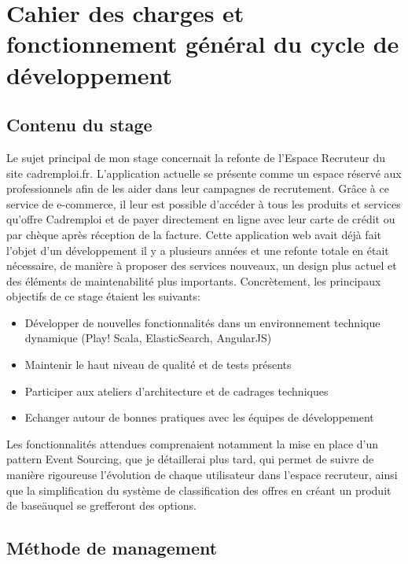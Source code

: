 \section{Cahier des charges et fonctionnement général du cycle de développement}
\subsection{Contenu du stage}
\label{sub:Contenu du stage}
Le sujet principal de mon stage concernait la refonte de l'Espace Recruteur du site cadremploi.fr.
L'application actuelle se présente comme un espace réservé aux professionnels afin de les aider dans leur campagnes de recrutement.
Grâce à ce service de e-commerce, il leur est possible d'accéder à tous les produits et services qu'offre Cadremploi et de payer directement en ligne avec leur carte de crédit ou par chèque après réception de la facture.
Cette application web avait déjà fait l'objet d'un développement il y a plusieurs années et une refonte totale en était nécessaire, de manière à proposer des services nouveaux, un design plus actuel et des éléments de maintenabilité plus importants.
Concrètement, les principaux objectifs de ce stage étaient les suivants:
\begin{itemize}
  \item{} Développer de nouvelles fonctionnalités dans un environnement technique dynamique (Play! Scala, ElasticSearch, AngularJS)
  \item{} Maintenir le haut niveau de qualité et de tests présents
  \item{} Participer aux ateliers d'architecture et de cadrages techniques
  \item{} Echanger autour de bonnes pratiques avec les équipes de développement
\end{itemize}
Les fonctionnalités attendues comprenaient notamment la mise en place d'un pattern Event Sourcing, que je détaillerai plus tard, qui permet de suivre de manière rigoureuse l'évolution de chaque utilisateur dans l'espace recruteur, ainsi que la simplification du système de classification des offres en créant un produit \"de base\" auquel se grefferont des options.

\subsection{Méthode de management}
\label{sub:Méthode de management}
